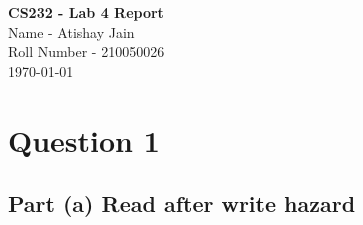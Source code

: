 \documentclass[12pt,a4paper]{article}
\begin{document}
\setlength{\parindent}{0cm}
\begin{center}
\vspace*{2em}
{\textbf {\huge CS232 - Lab 4 Report}}\\[5mm]
{\large Name - Atishay Jain \\ \vspace{0.5 ex} Roll Number - 210050026} \\[5mm]
\today\\[5mm] %
\end{center}

\section{Question 1}
\subsection{Part (a) Read after write hazard}




\end{document}
